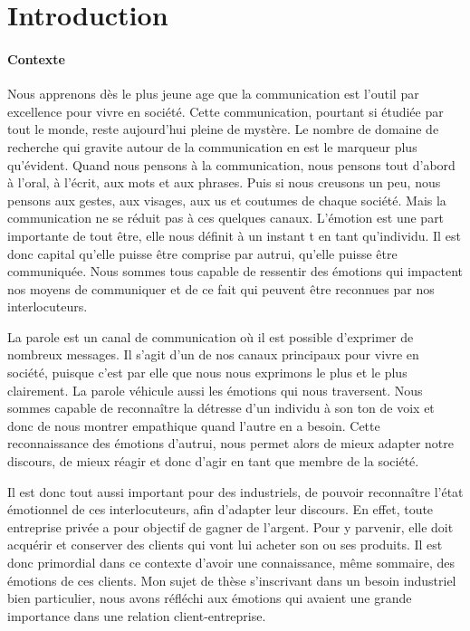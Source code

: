 \chapter*{Introduction}

\subsubsection{Contexte}

Nous apprenons dès le plus jeune age que la communication est l'outil par excellence pour vivre en société. Cette communication, pourtant si étudiée par tout le monde, reste aujourd'hui pleine de mystère. Le nombre de domaine de recherche qui gravite autour de la communication en est le marqueur plus qu'évident. Quand nous pensons à la communication, nous pensons tout d'abord à l'oral, à l'écrit, aux mots et aux phrases. Puis si nous creusons un peu, nous pensons aux gestes, aux visages, aux us et coutumes de chaque société. Mais la communication ne se réduit pas à ces quelques canaux. L'émotion est une part importante de tout être, elle nous définit à un instant t en tant qu'individu. Il est donc capital qu'elle puisse être comprise par autrui, qu'elle puisse être communiquée. Nous sommes tous capable de ressentir des émotions qui impactent nos moyens de communiquer et de ce fait qui peuvent être reconnues par nos interlocuteurs.

La parole est un canal de communication où il est possible d'exprimer de nombreux messages. Il s'agit d'un de nos canaux principaux pour vivre en société, puisque c'est par elle que nous nous exprimons le plus et le plus clairement. La parole véhicule aussi les émotions qui nous traversent. Nous sommes capable de reconnaître la détresse d'un individu à son ton de voix et donc de nous montrer empathique quand l'autre en a besoin. Cette reconnaissance des émotions d'autrui, nous permet alors de mieux adapter notre discours, de mieux réagir et donc d'agir en tant que membre de la société.

Il est donc tout aussi important pour des industriels, de pouvoir reconnaître l'état émotionnel de ces interlocuteurs, afin d'adapter leur discours. En effet, toute entreprise privée a pour objectif de gagner de l'argent. Pour y parvenir, elle doit acquérir et conserver des clients qui vont lui acheter son ou ses produits. Il est donc primordial dans ce contexte d'avoir une connaissance, même sommaire, des émotions de ces clients. Mon sujet de thèse s'inscrivant dans un besoin industriel bien particulier, nous avons réfléchi aux émotions qui avaient une grande importance dans une relation client-entreprise.

